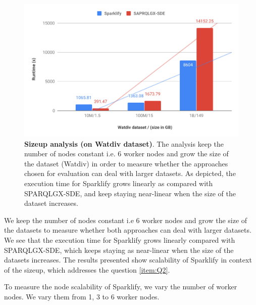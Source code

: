 \begin{figure}
 \includegraphics[width=1.0\columnwidth]{images/6_scalable_rdf_querying/sparklify-sizeup-scalability.pdf}
    \caption{\textbf{Sizeup analysis (on Watdiv dataset)}.
    The analysis keep the number of nodes constant i.e. 6 worker nodes and grow the size of the dataset (Watdiv) in order to measure whether the approaches chosen for evaluation can deal with larger datasets.
    As depicted, the execution time for Sparklify grows linearly as compared with SPARQLGX-SDE, and keep staying near-linear when the size of the dataset increases.}
    \label{fig:sparklify-sizeup-scalability}
\end{figure}

We keep the number of nodes constant i.e 6 worker nodes and grow the size of the datasets to measure whether both approaches can deal with larger datasets.
We see that the execution time for Sparklify grows linearly compared with SPARQLGX-SDE, which keeps staying as near-linear when the size of the datasets increases. 
The results presented show scalability of Sparklify in context of the sizeup, which addresses the question \ref{item:Q2}.

To measure the node scalability of Sparklify, we vary the number of worker nodes.
We vary them from 1, 3 to 6 worker nodes.

